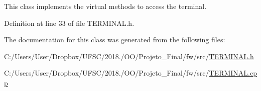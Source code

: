 This class implements the virtual methods to access the terminal. 

Definition at line 33 of file T\+E\+R\+M\+I\+N\+A\+L.\+h.



The documentation for this class was generated from the following files\+:\begin{DoxyCompactItemize}
\item 
C\+:/\+Users/\+User/\+Dropbox/\+U\+F\+S\+C/2018./\+O\+O/\+Projeto\+\_\+\+Final/fw/src/\mbox{\hyperlink{_t_e_r_m_i_n_a_l_8h}{T\+E\+R\+M\+I\+N\+A\+L.\+h}}\item 
C\+:/\+Users/\+User/\+Dropbox/\+U\+F\+S\+C/2018./\+O\+O/\+Projeto\+\_\+\+Final/fw/src/\mbox{\hyperlink{_t_e_r_m_i_n_a_l_8cpp}{T\+E\+R\+M\+I\+N\+A\+L.\+cpp}}\end{DoxyCompactItemize}
